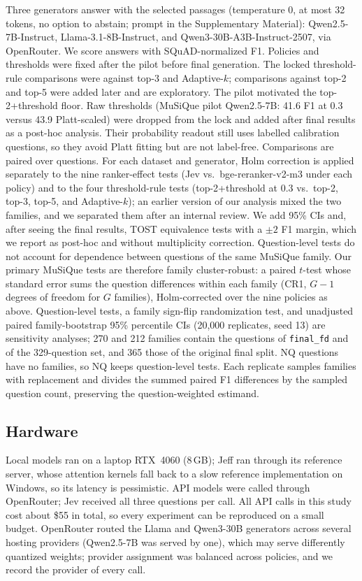 Three generators answer with the selected passages (temperature 0, at most 32 tokens, no option to abstain; prompt in the Supplementary Material): Qwen2.5-7B-Instruct\cite{qwen25}, Llama-3.1-8B-Instruct\cite{llama3}, and Qwen3-30B-A3B-Instruct-2507, via OpenRouter. We score answers with SQuAD-normalized F1\cite{rajpurkar2016squad}.
Policies and thresholds were fixed after the pilot before final generation. The locked threshold-rule comparisons were against top-3 and Adaptive-$k$; comparisons against top-2 and top-5 were added later and are exploratory. The pilot motivated the top-2+threshold floor. Raw thresholds (MuSiQue pilot Qwen2.5-7B: 41.6 F1 at 0.3 versus 43.9 Platt-scaled) were dropped from the lock and added after final results as a post-hoc analysis. Their probability readout still uses labelled calibration questions, so they avoid Platt fitting but are not label-free.
Comparisons are paired over questions. For each dataset and generator, Holm correction is applied separately to the nine ranker-effect tests (Jev vs.\ bge-reranker-v2-m3 under each policy) and to the four threshold-rule tests (top-2+threshold at 0.3 vs.\ top-2, top-3, top-5, and Adaptive-$k$); an earlier version of our analysis mixed the two families, and we separated them after an internal review. We add 95\% CIs and, after seeing the final results, TOST equivalence tests with a $\pm2$ F1 margin, which we report as post-hoc and without multiplicity correction.
Question-level tests do not account for dependence between questions of the same MuSiQue family. Our primary MuSiQue tests are therefore family cluster-robust: a paired $t$-test whose standard error sums the question differences within each family (CR1, $G-1$ degrees of freedom for $G$ families), Holm-corrected over the nine policies as above. Question-level tests, a family sign-flip randomization test, and unadjusted paired family-bootstrap 95\% percentile CIs (20,000 replicates, seed 13) are sensitivity analyses; 270 and 212 families contain the questions of \texttt{final\_fd} and of the 329-question set, and 365 those of the original final split. NQ questions have no families, so NQ keeps question-level tests. Each replicate samples families with replacement and divides the summed paired F1 differences by the sampled question count, preserving the question-weighted estimand.

\subsection{Hardware}

Local models ran on a laptop RTX~4060 (8\,GB); Jeff ran through its reference server, whose attention kernels fall back to a slow reference implementation on Windows, so its latency is pessimistic.
API models were called through OpenRouter; Jev received all three questions per call. All API calls in this study cost about \$55 in total, so every experiment can be reproduced on a small budget.
OpenRouter routed the Llama and Qwen3-30B generators across several hosting providers (Qwen2.5-7B was served by one), which may serve differently quantized weights; provider assignment was balanced across policies, and we record the provider of every call.
